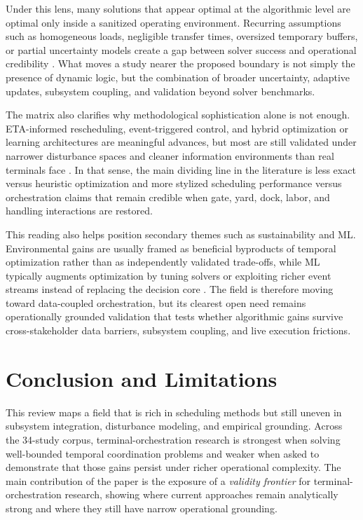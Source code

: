 \documentclass[preprint,12pt,number,longtitle]{elsarticle}
\begin{document}
Under this lens, many solutions that appear optimal at the algorithmic level are optimal only inside a sanitized operating environment. Recurring assumptions such as homogeneous loads, negligible transfer times, oversized temporary buffers, or partial uncertainty models create a gap between solver success and operational credibility \cite{noh2025,vahdani2019,essghaier2023}. What moves a study nearer the proposed boundary is not simply the presence of dynamic logic, but the combination of broader uncertainty, adaptive updates, subsystem coupling, and validation beyond solver benchmarks.

The matrix also clarifies why methodological sophistication alone is not enough. ETA-informed rescheduling, event-triggered control, and hybrid optimization or learning architectures are meaningful advances, but most are still validated under narrower disturbance spaces and cleaner information environments than real terminals face \cite{dasilva2023,cota2022,xu2022,modica2024,noh2025,luan2025,eti2025}. In that sense, the main dividing line in the literature is less exact versus heuristic optimization and more stylized scheduling performance versus orchestration claims that remain credible when gate, yard, dock, labor, and handling interactions are restored.

This reading also helps position secondary themes such as sustainability and ML. Environmental gains are usually framed as beneficial byproducts of temporal optimization rather than as independently validated trade-offs, while ML typically augments optimization by tuning solvers or exploiting richer event streams instead of replacing the decision core \cite{bouyahia2025,xu2021,xu2022,zhang2021,zhang2022,nogueira2025,dasilva2023,luan2025}. The field is therefore moving toward data-coupled orchestration, but its clearest open need remains operationally grounded validation that tests whether algorithmic gains survive cross-stakeholder data barriers, subsystem coupling, and live execution frictions.

\section{Conclusion and Limitations}

This review maps a field that is rich in scheduling methods but still uneven in subsystem integration, disturbance modeling, and empirical grounding. Across the 34-study corpus, terminal-orchestration research is strongest when solving well-bounded temporal coordination problems and weaker when asked to demonstrate that those gains persist under richer operational complexity. The main contribution of the paper is the exposure of a \textit{validity frontier} for terminal-orchestration research, showing where current approaches remain analytically strong and where they still have narrow operational grounding.
\end{document}
